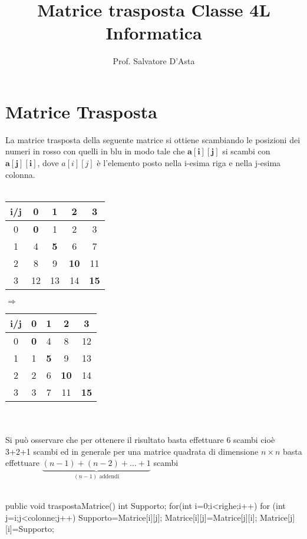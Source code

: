 \documentclass[10pt,a4paper]{article}
\title{Matrice trasposta Classe 4L Informatica}
\author{Prof. Salvatore D'Asta}
\begin{document}
\maketitle
\section{Matrice Trasposta}
La matrice trasposta della seguente matrice si ottiene scambiando le posizioni dei numeri in rosso con quelli in blu in modo tale che $ \mathbf{a[i][j]} $ si scambi con $ \mathbf{a[j][i]} $, dove $ a[i][j] $ è l'elemento posto nella i-esima riga e nella j-esima colonna.
\\\\
\begin{tabular}{c |c c c c|}
	i/j&0&1&2&3\\
	\hline 
	0&\textbf{0}&\color{red}1  &\color{red}2  &\color{red}3  \\ 
	1&\color{blue}4&\textbf{5}  &\color{red}6  &\color{red}7  \\ 
	2&\color{blue}8&\color{blue}9  &\textbf{10}  &\color{red}11  \\ 
	3&\color{blue}12&\color{blue}13  &\color{blue}14  &\textbf{15}  \\ 
\end{tabular} $ \Longrightarrow $
\begin{tabular}{c |c c c c|}
	i/j&0&1&2&3\\
	\hline 
	0&\textbf{0}&\color{blue}4  &\color{blue}8  &\color{blue}12  \\ 
	1&\color{red}1&\textbf{5}  &\color{blue}9  &\color{blue}13  \\ 
	2&\color{red}2&\color{red}6  &\textbf{10}  &\color{blue}14  \\ 
	3&\color{red}3&\color{red}7  &\color{red}11  &\textbf{15}  \\ 
\end{tabular}
\\\\
Si può osservare che per ottenere il risultato basta effettuare 6 scambi cioè 3+2+1 scambi ed in generale per una matrice quadrata di
 dimensione $ n\times n $ basta effettuare $\underbrace{ (n-1)+(n-2)+\dots+1}_{(n-1) \mbox{  addendi}} $ scambi
\\\\ 
\begin{java}
public void traspostaMatrice()
	{
		int Supporto;
		for(int i=0;i<righe;i++)
		{
		for (int j=i;j<colonne;j++)
		{
			Supporto=Matrice[i][j];
			Matrice[i][j]=Matrice[j][i];
			Matrice[j][i]=Supporto;
		}
	}
}
\end{java}
\end{document}
